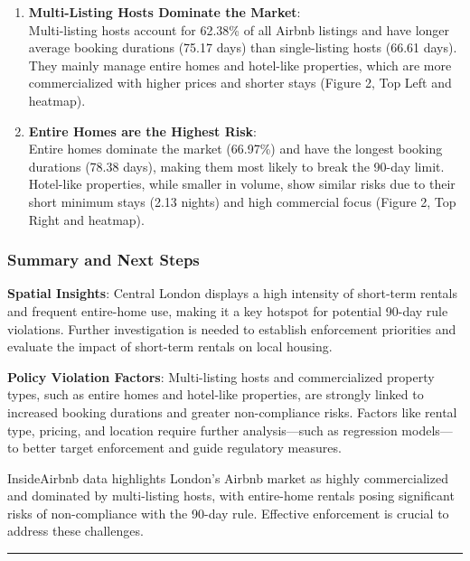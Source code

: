 \documentclass[
  a4paper,
  DIV=11,
  numbers=noendperiod]{scrartcl}
\begin{document}
\begin{enumerate}
\def\labelenumi{\arabic{enumi}.}
\setcounter{enumi}{2}
\item
  \textbf{Multi-Listing Hosts Dominate the Market}:\\
  Multi-listing hosts account for 62.38\% of all Airbnb listings and
  have longer average booking durations (75.17 days) than single-listing
  hosts (66.61 days). They mainly manage entire homes and hotel-like
  properties, which are more commercialized with higher prices and
  shorter stays (Figure 2, Top Left and heatmap).
\item
  \textbf{Entire Homes are the Highest Risk}:\\
  Entire homes dominate the market (66.97\%) and have the longest
  booking durations (78.38 days), making them most likely to break the
  90-day limit. Hotel-like properties, while smaller in volume, show
  similar risks due to their short minimum stays (2.13 nights) and high
  commercial focus (Figure 2, Top Right and heatmap).
\end{enumerate}

\subsubsection{Summary and Next Steps}\label{summary-and-next-steps}

\textbf{Spatial Insights}: Central London displays a high intensity of
short-term rentals and frequent entire-home use, making it a key hotspot
for potential 90-day rule violations. Further investigation is needed to
establish enforcement priorities and evaluate the impact of short-term
rentals on local housing.

\textbf{Policy Violation Factors}: Multi-listing hosts and
commercialized property types, such as entire homes and hotel-like
properties, are strongly linked to increased booking durations and
greater non-compliance risks. Factors like rental type, pricing, and
location require further analysis---such as regression models---to
better target enforcement and guide regulatory measures.

InsideAirbnb data highlights London's Airbnb market as highly
commercialized and dominated by multi-listing hosts, with entire-home
rentals posing significant risks of non-compliance with the 90-day rule.
Effective enforcement is crucial to address these challenges.

\begin{center}\rule{0.5\linewidth}{0.5pt}\end{center}
\end{document}
